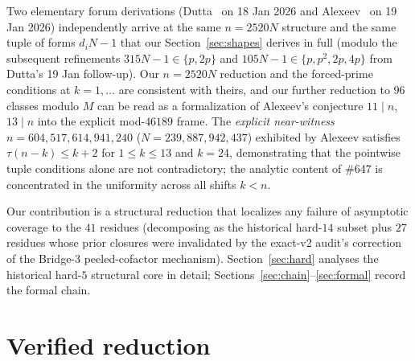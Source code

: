 \documentclass[11pt]{article}
\renewcommand{\_}{\origunderscore\allowbreak}
\theoremstyle{definition}
\theoremstyle{remark}
\begin{document}
Two elementary forum derivations (Dutta~\cite{Dutta} on 18 Jan 2026
and Alexeev~\cite{Alexeev} on 19 Jan 2026) independently arrive at
the same $n=2520N$ structure and the same tuple of forms
$d_iN-1$ that our Section~\ref{sec:shapes} derives in full (modulo
the subsequent refinements $315N-1\in\{p,2p\}$ and
$105N-1\in\{p,p^{2},2p,4p\}$ from Dutta's 19 Jan follow-up). Our
$n=2520N$ reduction and the forced-prime conditions at
$k=1,\ldots$ are consistent with theirs, and our further reduction
to $96$ classes modulo $M$ can be read as a formalization of
Alexeev's conjecture $11\mid n$, $13\mid n$ into the explicit
mod-$46189$ frame. The \emph{explicit near-witness}
$n = 604{,}517{,}614{,}941{,}240$ ($N = 239{,}887{,}942{,}437$)
exhibited by Alexeev satisfies $\tau(n-k)\le k+2$ for
$1\le k\le 13$ and $k=24$, demonstrating that the pointwise
tuple conditions alone are not contradictory; the analytic content
of \#647 is concentrated in the uniformity across all shifts $k<n$.

Our contribution is a structural reduction that localizes any
failure of asymptotic coverage to the $41$ residues
(decomposing as the historical hard-$14$ subset plus $27$ residues
whose prior closures were invalidated by the exact-v2 audit's
correction of the Bridge-3 peeled-cofactor mechanism).
Section~\ref{sec:hard} analyses the historical hard-$5$ structural
core in detail; Sections~\ref{sec:chain}--\ref{sec:formal} record
the formal chain.

\section{Verified reduction}\label{sec:reduction}
\end{document}
